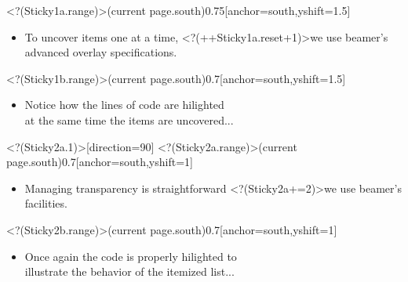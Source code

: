 \BealoverSticky<?(Sticky1a.range)>(current page.south){0.75\textwidth}[anchor=south,yshift=1.5\baselineskip]{\bfseries%
\vspace{-0.5\baselineskip}%
\begin{itemize}
\item[\myBulb]To uncover items one at a time,
\visible<?(++Sticky1a.reset+1)>{we use beamer's%
advanced overlay specifications.
}
\end{itemize}
}%
\BealoverSticky<?(Sticky1b.range)>(current page.south){0.7\textwidth}[anchor=south,yshift=1.5\baselineskip]{\bfseries%
\vspace{-0.5\baselineskip}%
\begin{itemize}
\item[\myBulb]Notice how the lines of code are hilighted\\at the same time the items are uncovered...
\end{itemize}
}%
\transpush<?(Sticky2a.1)>[direction=90]
\BealoverSticky<?(Sticky2a.range)>(current page.south){0.7\textwidth}[anchor=south,yshift=1\baselineskip]{\bfseries%
\vspace{-0.5\baselineskip}%
\begin{itemize}
\item[\myBulb]Managing transparency is straightforward
\visible<?(Sticky2a+=2)>{we use%
beamer's facilities.%
}%
\end{itemize}
}%
\BealoverSticky<?(Sticky2b.range)>(current page.south){0.7\textwidth}[anchor=south,yshift=1\baselineskip]{\bfseries%
\vspace{-0.5\baselineskip}%
\begin{itemize}
\item[\myBulb]Once again the code is properly hilighted to\\illustrate the behavior of the itemized list...
\end{itemize}
}%
%
